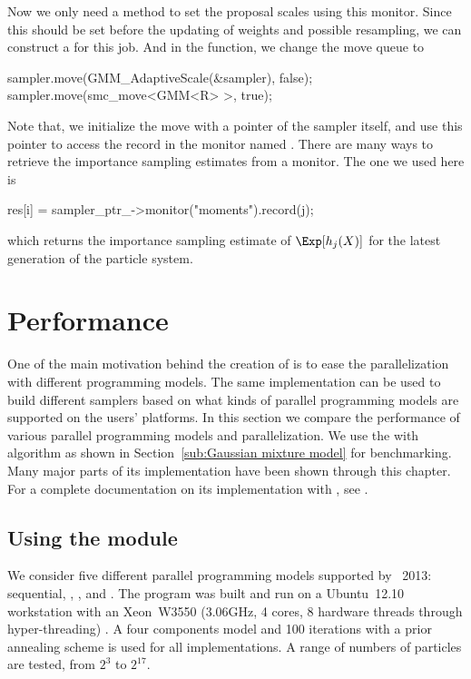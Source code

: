 Now we only need a method to set the proposal scales using this monitor. Since
this should be set before the updating of weights and possible resampling, we
can construct a  for this job.
And in the  function, we change the move queue to
\begin{cppcode}
sampler.move(GMM_AdaptiveScale(&sampler), false);
sampler.move(smc_move<GMM<R> >, true);
\end{cppcode}
Note that, we initialize the move with a pointer of the sampler itself, and
use this pointer to access the record in the monitor named
. There are many ways to retrieve the importance sampling
estimates from a monitor. The one we used here is
\begin{cppcode}
res[i] = sampler_ptr_->monitor("moments").record(j);
\end{cppcode}
which returns the importance sampling estimate of $\Exp[h_j(X)]$ for the latest
generation of the particle system.

\section{Performance}
\label{sec:vSMC Performance}

One of the main motivation behind the creation of \vsmc is to ease the
parallelization with different programming models. The same implementation can
be used to build different samplers based on what kinds of parallel programming
models are supported on the users' platforms. In this section we compare the
performance of various \smp parallel programming models and \opencl
parallelization. We use the \gmm with \smc[2] algorithm as shown in
Section~\ref{sub:Gaussian mixture model} for benchmarking. Many major parts of
its implementation have been shown through this chapter. For a complete
documentation on its implementation with \vsmc, see \cite{vsmcjss}.

\subsection{Using the \protect\smp module}
\label{sub:Using the SMP module}

We consider five different parallel programming models supported by
\icpc~2013: sequential, \tbb, \cilk, \openmp and \cppoo{}
. The program was built and run on a Ubuntu~12.10
workstation with an Xeon~W3550 (3.06GHz, 4 cores, 8 hardware threads through
hyper-threading) \cpu. A four components model and 100 iterations with a
prior annealing scheme is used for all implementations. A range of numbers of
particles are tested, from $2^3$ to $2^{17}$.

